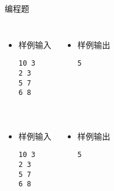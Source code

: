 \begin{frame}[fragile]
{\begin{exampleblock}{编程题}
{                    \begin{columns}[onlytextwidth,T]
                        \begin{itemize}
                            \item 样例输入

                                \lstinline|10 3|\\
                                \lstinline|2 3|\\
                                \lstinline|5 7|\\
                                \lstinline|6 8|

                        \end{itemize}

                        \begin{itemize}
                            \item 样例输出

                                \lstinline|5|

                        \end{itemize}
                    \end{columns}
                }{
                    \begin{columns}[onlytextwidth,T]
                        \begin{itemize}
                            \item 样例输入

                                \lstinline|10 3|\\
                                \lstinline|2 3|\\
                                \lstinline|5 7|\\
                                \lstinline|6 8|\\
                                \lstinline||

                        \end{itemize}

                        \begin{itemize}
                            \item 样例输出

                                \lstinline|5|

                        \end{itemize}
                    \end{columns}

}
\end{exampleblock}}
\end{frame}
